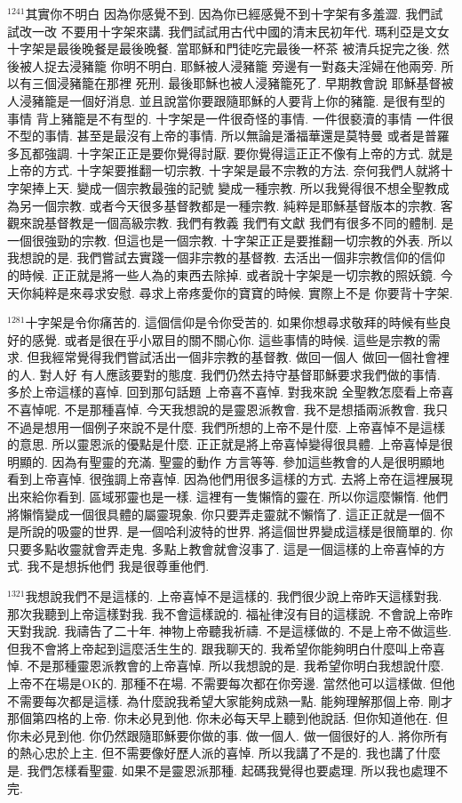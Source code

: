 \documentclass{book}
\begin{document}
$^{1241}$其實你不明白 因為你感覺不到.
因為你已經感覺不到十字架有多羞澀.
我們試試改一改 不要用十字架來講.
我們試試用古代中國的清末民初年代.
瑪利亞是文女 十字架是最後晚餐是最後晚餐.
當耶穌和門徒吃完最後一杯茶 被清兵捉完之後.
然後被人捉去浸豬籠 你明不明白.
耶穌被人浸豬籠 旁邊有一對姦夫淫婦在他兩旁.
所以有三個浸豬籠在那裡 死刑.
最後耶穌也被人浸豬籠死了.
早期教會說 耶穌基督被人浸豬籠是一個好消息.
並且說當你要跟隨耶穌的人要背上你的豬籠.
是很有型的事情 背上豬籠是不有型的.
十字架是一件很奇怪的事情.
一件很褻瀆的事情 一件很不型的事情.
甚至是最沒有上帝的事情.
所以無論是潘福華還是莫特曼 或者是普羅多瓦都強調.
十字架正正是要你覺得討厭.
要你覺得這正正不像有上帝的方式.
就是上帝的方式.
十字架要推翻一切宗教.
十字架是最不宗教的方法.
奈何我們人就將十字架捧上天.
變成一個宗教最強的記號 變成一種宗教.
所以我覺得很不想全聖教成為另一個宗教.
或者今天很多基督教都是一種宗教.
純粹是耶穌基督版本的宗教.
客觀來說基督教是一個高級宗教.
我們有教義 我們有文獻 我們有很多不同的體制.
是一個很強勁的宗教.
但這也是一個宗教.
十字架正正是要推翻一切宗教的外表.
所以我想說的是.
我們嘗試去實踐一個非宗教的基督教.
去活出一個非宗教信仰的信仰的時候.
正正就是將一些人為的東西去除掉.
或者說十字架是一切宗教的照妖鏡.
今天你純粹是來尋求安慰.
尋求上帝疼愛你的寶寶的時候.
實際上不是 你要背十字架.

$^{1281}$十字架是令你痛苦的.
這個信仰是令你受苦的.
如果你想尋求敬拜的時候有些良好的感覺.
或者是很在乎小眾目的關不關心你.
這些事情的時候.
這些是宗教的需求.
但我經常覺得我們嘗試活出一個非宗教的基督教.
做回一個人 做回一個社會裡的人.
對人好 有人應該要對的態度.
我們仍然去持守基督耶穌要求我們做的事情.
多於上帝這樣的喜悼.
回到那句話題 上帝喜不喜悼.
對我來說 全聖教怎麼看上帝喜不喜悼呢.
不是那種喜悼.
今天我想說的是靈恩派教會.
我不是想插兩派教會.
我只不過是想用一個例子來說不是什麼.
我們所想的上帝不是什麼.
上帝喜悼不是這樣的意思.
所以靈恩派的優點是什麼.
正正就是將上帝喜悼變得很具體.
上帝喜悼是很明顯的.
因為有聖靈的充滿.
聖靈的動作 方言等等.
參加這些教會的人是很明顯地看到上帝喜悼.
很強調上帝喜悼.
因為他們用很多這樣的方式.
去將上帝在這裡展現出來給你看到.
區域邪靈也是一樣.
這裡有一隻懶惰的靈在.
所以你這麼懶惰.
他們將懶惰變成一個很具體的屬靈現象.
你只要弄走靈就不懶惰了.
這正正就是一個不是所說的吸靈的世界.
是一個哈利波特的世界.
將這個世界變成這樣是很簡單的.
你只要多點收靈就會弄走鬼.
多點上教會就會沒事了.
這是一個這樣的上帝喜悼的方式.
我不是想拆他們 我是很尊重他們.

$^{1321}$我想說我們不是這樣的.
上帝喜悼不是這樣的.
我們很少說上帝昨天這樣對我.
那次我聽到上帝這樣對我.
我不會這樣說的.
福祉律沒有目的這樣說.
不會說上帝昨天對我說.
我禱告了二十年.
神物上帝聽我祈禱.
不是這樣做的.
不是上帝不做這些.
但我不會將上帝起到這麼活生生的.
跟我聊天的.
我希望你能夠明白什麼叫上帝喜悼.
不是那種靈恩派教會的上帝喜悼.
所以我想說的是.
我希望你明白我想說什麼.
上帝不在場是OK的.
那種不在場.
不需要每次都在你旁邊.
當然他可以這樣做.
但他不需要每次都是這樣.
為什麼說我希望大家能夠成熟一點.
能夠理解那個上帝.
剛才那個第四格的上帝.
你未必見到他.
你未必每天早上聽到他說話.
但你知道他在.
但你未必見到他.
你仍然跟隨耶穌要你做的事.
做一個人.
做一個很好的人.
將你所有的熱心忠於上主.
但不需要像好歷人派的喜悼.
所以我講了不是的.
我也講了什麼是.
我們怎樣看聖靈.
如果不是靈恩派那種.
起碼我覺得也要處理.
所以我也處理不完.
\end{document}
